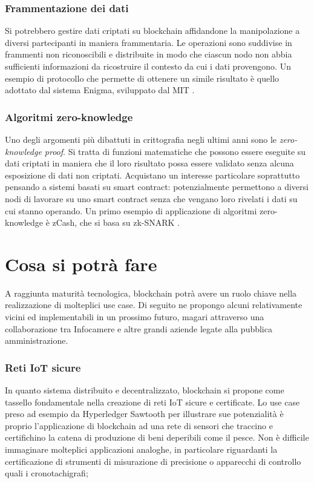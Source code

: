         \subsubsection{Frammentazione dei dati}
            Si potrebbero gestire dati criptati su blockchain affidandone la manipolazione a diversi partecipanti in maniera frammentaria. Le operazioni sono suddivise in frammenti non riconoscibili e distribuite in modo che ciascun nodo non abbia sufficienti informazioni da ricostruire il contesto da cui i dati provengono. Un esempio di protocollo che permette di ottenere un simile risultato è quello adottato dal sistema Enigma, sviluppato dal MIT \cite{enigma}.
            
        \subsubsection{Algoritmi zero-knowledge}
            Uno degli argomenti più dibattuti in crittografia negli ultimi anni sono le \emph{zero-knowledge proof}. Si tratta di funzioni matematiche che possono essere eseguite su dati criptati in maniera che il loro risultato possa essere validato senza alcuna esposizione di dati non criptati. Acquistano un interesse particolare soprattutto pensando a sistemi basati su smart contract: potenzialmente permettono a diversi nodi di lavorare su uno smart contract senza che vengano loro rivelati i dati su cui stanno operando. Un primo esempio di applicazione di algoritmi zero-knowledge è zCash, che si basa su zk-SNARK \cite{zkSNARK}.

\section{Cosa si potrà fare}
	A raggiunta maturità tecnologica, blockchain potrà avere un ruolo chiave nella realizzazione di molteplici use case. Di seguito ne propongo alcuni relativamente vicini ed implementabili in un prossimo futuro, magari attraverso una collaborazione tra Infocamere e altre grandi aziende legate alla pubblica amministrazione.
		
    \subsubsection{Reti IoT sicure}
        	In quanto sistema distribuito e decentralizzato, blockchain si propone come tassello fondamentale nella creazione di reti IoT sicure e certificate. Lo use case preso ad esempio da Hyperledger Sawtooth per illustrare sue potenzialità è proprio l'applicazione di blockchain ad una rete di sensori che traccino e certifichino la catena di produzione di beni deperibili come il pesce. Non è difficile immaginare molteplici applicazioni analoghe, in particolare riguardanti la certificazione di strumenti di misurazione di precisione o apparecchi di controllo quali i cronotachigrafi;
        	

